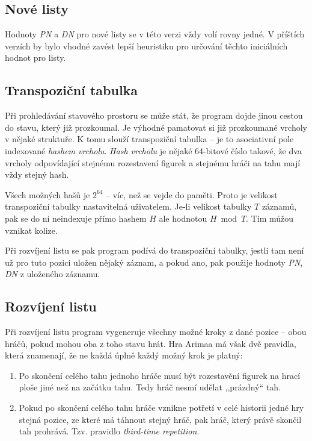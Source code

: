 \documentclass{article}
\begin{document}
\subsection{Nové listy}
Hodnoty \emph{PN} a \emph{DN} pro nové listy se v této verzi vždy volí rovny jedné. V příštích verzích by bylo vhodné
zavést lepší heuristiku pro určování těchto iniciálních hodnot pro listy.

\subsection{Transpoziční tabulka}
Při prohledávání stavového prostoru se může stát, že program dojde jinou cestou do stavu, který již prozkoumal. Je
výhodné pamatovat si již prozkoumané vrcholy v nějaké struktuře. K tomu slouží transpoziční tabulka -- je to asociativní
pole indexované \emph{hashem vrcholu}. \emph{Hash vrcholu} je nějaké 64-bitové číslo takové, že dva vrcholy odpovídající
stejnému rozestavení figurek a stejnému hráči na tahu mají vždy stejný hash.

Všech možných hašů je $2^{64}$ -- víc, než se vejde do paměti. Proto je velikost transpoziční tabulky nastavitelná
uživatelem. Je-li velikost tabulky $T$ záznamů, pak se do ní neindexuje přímo hashem $H$ ale hodnotou $H \bmod T$. Tím
můžou vznikat kolize.

Při rozvíjení listu se pak program podívá do transpoziční tabulky, jestli tam není už pro tuto pozici uložen nějaký
záznam, a pokud ano, pak použije hodnoty \emph{PN}, \emph{DN} z uloženého záznamu.

\subsection{Rozvíjení listu}
Při rozvíjení listu program vygeneruje všechny možné kroky z dané pozice -- obou hráčů, pokud mohou oba z toho stavu
hrát. Hra Arimaa má však dvě pravidla, která znamenají, že ne každá úplně každý možný krok je platný:
\begin{enumerate}
  \item Po skončení celého tahu jednoho hráče musí být rozestavění figurek na hrací ploše jiné než na začátku tahu. Tedy
  hráč nesmí udělat ,,prázdný`` tah.
  \item Pokud po skončení celého tahu hráče vznikne potřetí v celé historii jedné hry stejná pozice, ze které má táhnout
  stejný hráč, pak hráč, který právě skončil tah prohrává. Tzv. pravidlo \emph{third-time repetition}.
\end{enumerate}
\end{document}
